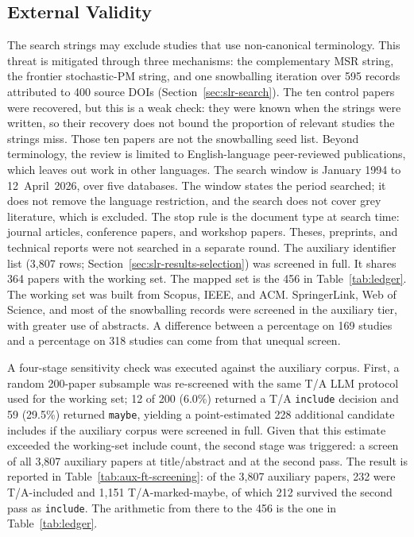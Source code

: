 \subsection{External Validity}

The search strings may exclude studies that use non-canonical terminology.
This threat is mitigated through three mechanisms: the complementary MSR
string, the frontier stochastic-PM string, and one snowballing iteration
over 595 records attributed to 400 source DOIs
(Section~\ref{sec:slr-search}). The ten control papers were recovered, but
this is a weak check: they were known when the strings were written, so
their recovery does not bound the proportion of relevant studies the
strings miss. Those ten papers are not the snowballing seed list.
Beyond terminology, the review is limited to English-language
peer-reviewed publications, which leaves out work in other languages.
The search window is January 1994 to 12~April~2026, over five databases.
The window states the period searched; it does not remove the language
restriction, and the search does not cover grey literature, which is
excluded. The stop rule is the document type at search time: journal
articles, conference papers, and workshop papers. Theses, preprints, and
technical reports were not searched in a separate round. The auxiliary
identifier list (3{,}807 rows; Section~\ref{sec:slr-results-selection})
was screened in full. It shares 364 papers with the working set.
The mapped set is the 456 in
Table~\ref{tab:ledger}. The working set was built from Scopus, IEEE, and
ACM. SpringerLink, Web of Science, and most of the snowballing records
were screened in the auxiliary tier, with greater use of abstracts. A
difference between a percentage on 169 studies and a percentage on 318
studies can come from that unequal screen.

A four-stage sensitivity check was executed against the auxiliary corpus.
First, a random 200-paper subsample was re-screened with the same T/A LLM
protocol used for the working set;
12 of 200 (6.0\%) returned a T/A
\texttt{include} decision and 59 (29.5\%) returned \texttt{maybe}, yielding
a point-estimated 228 additional candidate includes if the auxiliary corpus
were screened in full. Given that this estimate exceeded the working-set
include count, the second stage was triggered: a screen of all 3{,}807
auxiliary papers at title/abstract and at the second pass.
The result is reported in
Table~\ref{tab:aux-ft-screening}: of the 3{,}807 auxiliary papers, 232
were T/A-included and 1{,}151 T/A-marked-maybe, of which 212 survived the
second pass as \texttt{include}. The arithmetic from there to the 456 is
the one in Table~\ref{tab:ledger}.

